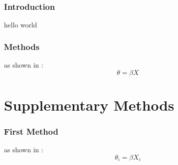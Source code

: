 \documentclass[blind]{ms}
\begin{document}
  
  \maketitle
  \section{Introduction}
  hello world
  \section{Methods}
  as shown in \cite{Last2001}:
  \begin{equation} \theta = \beta X \end{equation}
  \printbibliography
  \appendix
  \part{Supplementary Methods}
  \section{First Method}
  as shown in \cite{Last2002}:
  \begin{equation} \theta_i = \beta X_i \end{equation}
  \printbibliography
\end{document}

